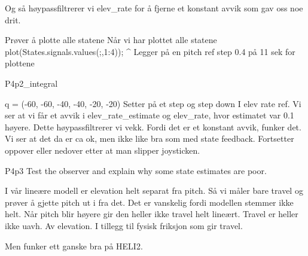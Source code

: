 Og så høypassfiltrerer vi elev_rate for å fjerne et konstant avvik som gav oss noe drit. 

Prøver å plotte alle statene
Når vi har plottet alle statene
plot(States.signals.values(;,1:4));
^
    Legger på en pitch ref step 0.4 på 11 sek for plottene 

P4p2_integral 

 q = (-60, -60, -40, -40, -20, -20) 
Setter på et step og step down I elev rate ref. 
Vi ser at vi får et avvik i elev_rate_estimate og elev_rate, hvor estimatet var 0.1 høyere. Dette høypassfiltrerer vi vekk. Fordi det er et konstant avvik, funker det. 
Vi ser at det da er ca ok, men ikke like bra som med state feedback. 
Fortsetter oppover eller nedover etter at man slipper joysticken.


P4p3 
Test the observer and explain why some state estimates are poor. 


I vår lineære modell er elevation helt separat fra pitch. Så vi måler bare travel og prøver å gjette pitch ut i fra det. Det er vanskelig fordi modellen stemmer ikke helt. Når pitch blir høyere gir den heller ikke travel helt lineært. Travel er heller ikke uavh. Av elevation.
 I tillegg til fysisk friksjon som gir travel. 

Men funker ett ganske bra på HELI2. 